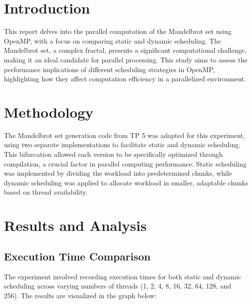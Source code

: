 \documentclass[11pt]{article}
\begin{document}
    
    \maketitle
    \thispagestyle{empty}
    \newpage

    \tableofcontents
    
    \newpage

\hypertarget{introduction}{%
\section{Introduction}\label{introduction}}

This report delves into the parallel computation of the Mandelbrot set
using OpenMP, with a focus on comparing static and dynamic scheduling.
The Mandelbrot set, a complex fractal, presents a significant
computational challenge, making it an ideal candidate for parallel
processing. This study aims to assess the performance implications of
different scheduling strategies in OpenMP, highlighting how they affect
computation efficiency in a parallelized environment.

\hypertarget{methodology}{%
\section{Methodology}\label{methodology}}

The Mandelbrot set generation code from TP 5 was adapted for this
experiment, using two separate implementations to facilitate static and
dynamic scheduling. This bifurcation allowed each version to be
specifically optimized through compilation, a crucial factor in parallel
computing performance. Static scheduling was implemented by dividing the
workload into predetermined chunks, while dynamic scheduling was applied
to allocate workload in smaller, adaptable chunks based on thread
availability.

\hypertarget{results-and-analysis}{%
\section{Results and Analysis}\label{results-and-analysis}}

\hypertarget{execution-time-comparison}{%
\subsection{Execution Time
Comparison}\label{execution-time-comparison}}

The experiment involved recording execution times for both static and
dynamic scheduling across varying numbers of threads (1, 2, 4, 8, 16,
32, 64, 128, and 256). The results are visualized in the graph below:
\end{document}
